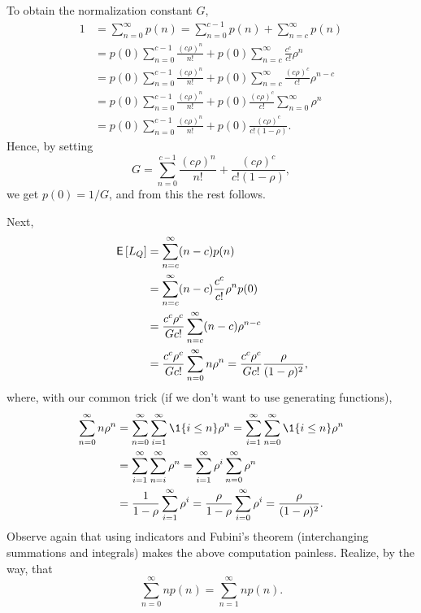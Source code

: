 \begin{exercise}
\begin{solution}
To obtain  the normalization constant $G$,
\begin{align*}
1 &= \sum_{n=0}^\infty p(n) 
= \sum_{n=0}^{c-1} p(n) + \sum_{n=c}^\infty p(n) \\
&=p(0) \sum_{n=0}^{c-1}\frac{(c\rho)^n}{n!} + 
 p(0)\sum_{n=c}^{\infty} \frac{c^c}{c!} \rho^{n}  \\
&=p(0)\sum_{n=0}^{c-1}\frac{(c\rho)^n}{n!} + 
 p(0) \sum_{n=c}^{\infty} \frac{(c\rho)^c}{c!} \rho^{n-c}  \\
&= 
p(0)\sum_{n=0}^{c-1}\frac{(c\rho)^n}{n!} + 
p(0)\frac{(c\rho)^c}{c!} \sum_{n=0}^{\infty} \rho^n \\
&= 
p(0) \sum_{n=0}^{c-1}\frac{(c\rho)^n}{n!} + 
p(0)\frac{(c\rho)^c}{c!(1-\rho)}.
\end{align*}
Hence, by setting
\begin{equation*}
  G= \sum_{n=0}^{c-1}\frac{(c\rho)^n}{n!} + \frac{(c\rho)^c}{c!(1-\rho)},
\end{equation*}
we get $p(0)=1/G$, and from this the rest follows. 

Next, 
\begin{align*}
  \,\mathsf{E}\left[L_Q\right] 
&=\sum_{n=c}^\infty (n-c) p(n) \\
&=\sum_{n=c}^\infty (n-c) \frac{c^c}{c!}\rho^{n} p(0) \\
&=\frac{c^c\rho^c}{G c!} \sum_{n=c}^\infty (n-c) \rho^{n-c} \\
&=\frac{c^c\rho^c}{G c!} \sum_{n=0}^\infty n \rho^n 
=\frac{c^c\rho^c}{G c!} \frac{\rho}{(1-\rho)^2},
\end{align*}
where, with our common trick (if we don't want to use generating functions),
\begin{align*}
  \sum_{n=0}^\infty n \rho^n 
&= \sum_{n=0}^\infty \sum_{i=1}^\infty \1{i\leq n} \rho^n
= \sum_{i=1}^\infty   \sum_{n=0}^\infty \1{i\leq n} \rho^n\\
&= \sum_{i=1}^\infty   \sum_{n=i}^\infty \rho^n
= \sum_{i=1}^\infty   \rho^i \sum_{n=0}^\infty \rho^n\\
&= \frac1{1-\rho} \sum_{i=1}^\infty   \rho^i 
= \frac\rho{1-\rho} \sum_{i=0}^\infty   \rho^i 
= \frac\rho{(1-\rho)^2}.
\end{align*}
Observe again that using indicators and Fubini's theorem
(interchanging summations and integrals) makes the above computation
painless. Realize, by the way, that
\begin{equation*}
  \sum_{n=0}^\infty n p(n) = \sum_{n=1}^\infty n p(n).
\end{equation*}


\end{solution}
\end{exercise}
